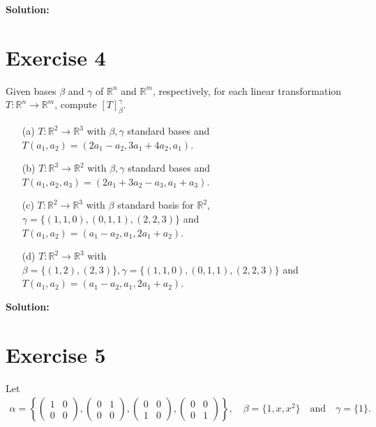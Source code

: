 \documentclass{article}
\begin{document}
\textbf{Solution: }\\



\newpage

\section*{Exercise 4}
Given bases $\beta$ and $\gamma$ of $\mathbb{R}^n$ and $\mathbb{R}^m$, respectively, for each linear transformation $T : \mathbb{R}^n \to \mathbb{R}^m$, compute $[T]_{\beta}^{\gamma}$.

\begin{itemize}
    \item[(a)] $T : \mathbb{R}^2 \to \mathbb{R}^3$ with $\beta, \gamma$ standard bases and $T(a_1, a_2) = (2a_1 - a_2, 3a_1 + 4a_2, a_1)$.

    \item[(b)] $T : \mathbb{R}^3 \to \mathbb{R}^2$ with $\beta, \gamma$ standard bases and $T(a_1, a_2, a_3) = (2a_1 + 3a_2 - a_3, a_1 + a_3)$.

    \item[(c)] $T : \mathbb{R}^2 \to \mathbb{R}^3$ with $\beta$ standard basis for $\mathbb{R}^2$, $\gamma = \{(1,1,0),(0,1,1),(2,2,3)\}$ and $T(a_1, a_2) = (a_1 - a_2, a_1, 2a_1 + a_2)$.

    \item[(d)] $T : \mathbb{R}^2 \to \mathbb{R}^3$ with $\beta = \{(1,2),(2,3)\}, \gamma = \{(1,1,0),(0,1,1),(2,2,3)\}$ and $T(a_1, a_2) = (a_1 - a_2, a_1, 2a_1 + a_2)$.
\end{itemize}

\textbf{Solution: }\\



\newpage

\section*{Exercise 5}
Let
\begin{align*}
\alpha = \left\{\left(\begin{matrix} 1 & 0 \\ 0 & 0 \end{matrix}\right), \left(\begin{matrix} 0 & 1 \\ 0 & 0 \end{matrix}\right), \left(\begin{matrix} 0 & 0 \\ 1 & 0 \end{matrix}\right), \left(\begin{matrix} 0 & 0 \\ 0 & 1 \end{matrix}\right)\right\}, \quad \beta = \{1, x, x^2\} \quad \text{and} \quad \gamma = \{1\}.
\end{align*}
\end{document}
